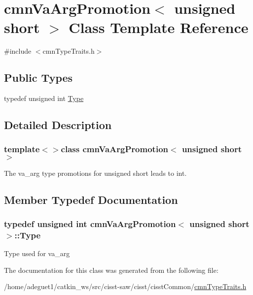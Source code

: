 \hypertarget{classcmn_va_arg_promotion_3_01unsigned_01short_01_4}{\section{cmn\-Va\-Arg\-Promotion$<$ unsigned short $>$ Class Template Reference}
\label{classcmn_va_arg_promotion_3_01unsigned_01short_01_4}
}


{\ttfamily \#include $<$cmn\-Type\-Traits.\-h$>$}

\subsection*{Public Types}
\begin{DoxyCompactItemize}
\item 
typedef unsigned int \hyperlink{classcmn_va_arg_promotion_3_01unsigned_01short_01_4_abe23760ad365e7207cc1bfb4c50abba7}{Type}
\end{DoxyCompactItemize}


\subsection{Detailed Description}
\subsubsection*{template$<$$>$class cmn\-Va\-Arg\-Promotion$<$ unsigned short $>$}

The va\-\_\-arg type promotions for unsigned short leads to int. 

\subsection{Member Typedef Documentation}
\hypertarget{classcmn_va_arg_promotion_3_01unsigned_01short_01_4_abe23760ad365e7207cc1bfb4c50abba7}{
\subsubsection[{Type}]{\setlength{\rightskip}{0pt plus 5cm}typedef unsigned int {\bf cmn\-Va\-Arg\-Promotion}$<$ unsigned short $>$\-::{\bf Type}}}\label{classcmn_va_arg_promotion_3_01unsigned_01short_01_4_abe23760ad365e7207cc1bfb4c50abba7}
Type used for va\-\_\-arg 

The documentation for this class was generated from the following file\-:\begin{DoxyCompactItemize}
\item 
/home/adeguet1/catkin\-\_\-ws/src/cisst-\/saw/cisst/cisst\-Common/\hyperlink{cmn_type_traits_8h}{cmn\-Type\-Traits.\-h}\end{DoxyCompactItemize}
